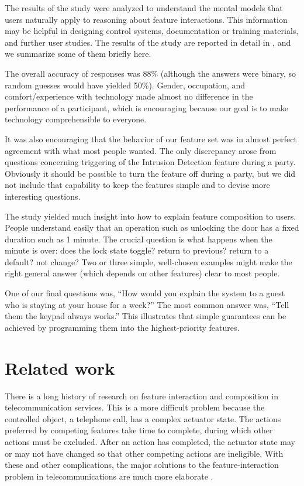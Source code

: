 \documentclass[conference]{IEEEtran}
\begin{document}
The results of the study were analyzed to understand the mental
models that users naturally apply to reasoning about feature
interactions.
This information may be helpful in designing control systems,
documentation or training materials, 
and further user studies.
The results of the study are reported in
detail in \cite{lanaCHI}, and we summarize some of them briefly
here.

The overall accuracy of responses was 88\% (although the answers were
binary, so random guesses would have yielded 50\%).
Gender, occupation, and comfort/experience with technology
made almost no difference in the performance of a participant, which
is encouraging because our goal is to make technology comprehensible
to everyone.

It was also encouraging that the behavior of our
feature set was in almost perfect
agreement with what most people wanted.
The only discrepancy arose from questions concerning triggering
of the Intrusion
Detection feature during a party.
Obviously it should be possible to turn the feature off during a party,
but we did not include that capability to keep the features simple
and to devise more interesting questions.

The study yielded much insight into how to explain feature composition
to users.
People understand easily that an operation such as unlocking the door
has a fixed duration such as 1 minute.
The crucial question is what happens when the minute is over:
does the lock state toggle?  return to previous?  return to a default?
not change?
Two or three simple, well-chosen examples might make the right general
answer (which depends on other features) clear to most people.

One of our final questions was, ``How would you explain the system to
a guest who is staying at your house for a week?''
The most common answer was, ``Tell them the keypad always works.''
This illustrates that simple guarantees can be achieved by
programming them into the highest-priority features.

\section{Related work}
\label{sec:related}

There is a long history of research on feature interaction and composition
in telecommunication services.
This is a more difficult problem because the controlled object, a
telephone call, has a complex actuator state.
The actions preferred by competing features take time to complete,
during which other actions must be excluded.
After an action has completed, the actuator 
state may or may not have changed
so that other competing actions are ineligible.
With these and other complications, the major solutions to the
feature-interaction problem in telecommunications are much more elaborate 
\cite{braithwaite,hayAtlee,ODFC,marplesmagill,modDFC}.
\end{document}
